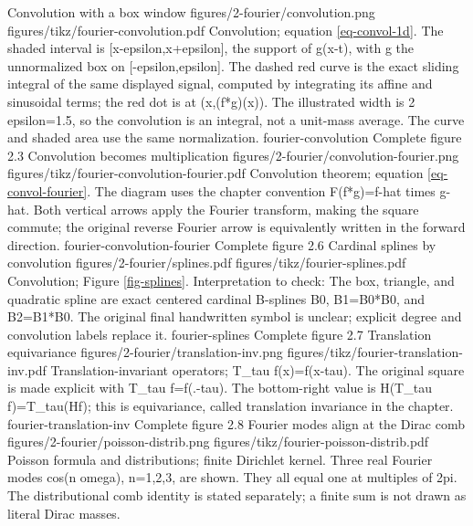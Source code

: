 {Convolution with a box window}
{figures/2-fourier/convolution.png}
{figures/tikz/fourier-convolution.pdf}
{Convolution; equation \eqref{eq-convol-1d}.}
{The shaded interval is [x-epsilon,x+epsilon], the support of g(x-t), with g the unnormalized box on [-epsilon,epsilon]. The dashed red curve is the exact sliding integral of the same displayed signal, computed by integrating its affine and sinusoidal terms; the red dot is at (x,(f*g)(x)). The illustrated width is 2 epsilon=1.5, so the convolution is an integral, not a unit-mass average. The curve and shaded area use the same normalization.}
{fourier-convolution}
{Complete figure}
{2.3}
{Convolution becomes multiplication}
{figures/2-fourier/convolution-fourier.png}
{figures/tikz/fourier-convolution-fourier.pdf}
{Convolution theorem; equation \eqref{eq-convol-fourier}.}
{The diagram uses the chapter convention F(f*g)=f-hat times g-hat. Both vertical arrows apply the Fourier transform, making the square commute; the original reverse Fourier arrow is equivalently written in the forward direction.}
{fourier-convolution-fourier}
{Complete figure}
{2.6}
{Cardinal splines by convolution}
{figures/2-fourier/splines.pdf}
{figures/tikz/fourier-splines.pdf}
{Convolution; Figure \ref{fig-splines}.}
{Interpretation to check: The box, triangle, and quadratic spline are exact centered cardinal B-splines B0, B1=B0*B0, and B2=B1*B0. The original final handwritten symbol is unclear; explicit degree and convolution labels replace it.}
{fourier-splines}
{Complete figure}
{2.7}
{Translation equivariance}
{figures/2-fourier/translation-inv.png}
{figures/tikz/fourier-translation-inv.pdf}
{Translation-invariant operators; T\_tau f(x)=f(x-tau).}
{The original square is made explicit with T\_tau f=f(.-tau). The bottom-right value is H(T\_tau f)=T\_tau(Hf); this is equivariance, called translation invariance in the chapter.}
{fourier-translation-inv}
{Complete figure}
{2.8}
{Fourier modes align at the Dirac comb}
{figures/2-fourier/poisson-distrib.png}
{figures/tikz/fourier-poisson-distrib.pdf}
{Poisson formula and distributions; finite Dirichlet kernel.}
{Three real Fourier modes cos(n omega), n=1,2,3, are shown. They all equal one at multiples of 2pi. The distributional comb identity is stated separately; a finite sum is not drawn as literal Dirac masses.}
